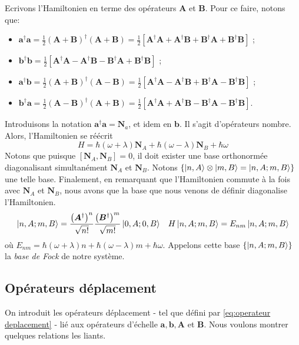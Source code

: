 \documentclass[11pt,oneside,a4paper]{article}
\newcommand{\h}{\ensuremath{\hbar}}
\begin{document}
Ecrivons l'Hamiltonien en terme des opérateurs $\bm{A}$ et $\bm{B}$. Pour ce faire, notons que:
\begin{itemize}
  \item $\bm{a}^\dagger\bm{a} = \frac{1}{2}\left(\bm{A}+\bm{B}\right)^\dagger\left(\bm{A}+\bm{B}\right) = \frac{1}{2}\left[\bm{A}^\dagger\bm{A}+\bm{A}^\dagger\bm{B}+\bm{B}^\dagger\bm{A}+\bm{B}^\dagger\bm{B}\right]$ ;\\
  \item $\bm{b}^\dagger\bm{b} = \frac{1}{2}\left[\bm{A}^\dagger\bm{A}-\bm{A}^\dagger\bm{B}-\bm{B}^\dagger\bm{A}+\bm{B}^\dagger\bm{B}\right]$ ;
  \item $\bm{a}^\dagger\bm{b} = \frac{1}{2}\left(\bm{A}+\bm{B}\right)^\dagger\left(\bm{A}-\bm{B}\right) = \frac{1}{2}\left[\bm{A}^\dagger\bm{A}-\bm{A}^\dagger\bm{B}+\bm{B}^\dagger\bm{A}-\bm{B}^\dagger\bm{B}\right]$ ;\\
  \item $\bm{b}^\dagger\bm{a} = \frac{1}{2}\left(\bm{A}-\bm{B}\right)^\dagger\left(\bm{A}+\bm{B}\right) = \frac{1}{2}\left[\bm{A}^\dagger\bm{A}+\bm{A}^\dagger\bm{B}-\bm{B}^\dagger\bm{A}-\bm{B}^\dagger\bm{B}\right]$.
\end{itemize}
Introduisons la notation $\bm{a}^\dagger\bm{a} = \bm{N}_a$, et idem en $\bm{b}$. Il s'agit d'opérateurs nombre. Alors, l'Hamiltonien se réécrit
\begin{equation}
  H = \h\left(\omega+\lambda\right)\bm{N}_A+\h\left(\omega-\lambda\right)\bm{N}_B+\h\omega
\end{equation}
Notons que puisque $[\bm{N}_A,\bm{N}_B] = 0$, il doit exister une base orthonormée diagonalisant simultanément $\bm{N}_A$ et $\bm{N}_B$. Notons $\left\{\ket{n,A}\otimes\ket{m,B} = \ket{n,A;m,B}\right\}$ une telle base. Finalement, en remarquant que l'Hamiltonien commute à la fois avec $\bm{N}_A$ et $\bm{N}_B$, nous avons que la base que nous venons de définir diagonalise l'Hamiltonien.
\begin{align}
  \ket{n,A;m,B} &= \frac{\left(\bm{A}^\dagger\right)^n}{\sqrt{n!}}\frac{\left(\bm{B}^\dagger\right)^m}{\sqrt{m!}}\ket{0,A;0,B} &H\ket{n,A;m,B} = E_{nm}\ket{n,A;m,B}\label{eq: Emn}
\end{align}
où $E_{nm} = \h\left(\omega+\lambda\right)n+\h\left(\omega-\lambda\right)m+\h\omega$. Appelons cette base $\left\{\ket{n,A;m,B}\right\}$ la \emph{base de Fock} de notre système.
\subsection{Opérateurs déplacement}
On introduit les opérateurs déplacement - tel que défini par \eqref{eq:operateur deplacement} - lié aux opérateurs d'échelle $\bm{a},\bm{b},\bm{A}$ et $\bm{B}$.
Nous voulons montrer quelques relations les liants.
\end{document}

